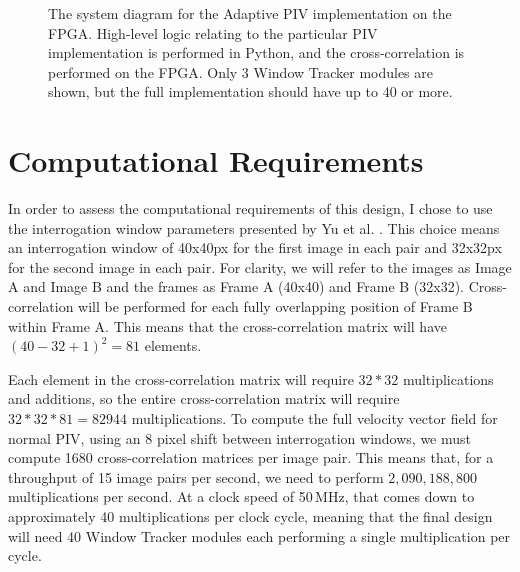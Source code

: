 \documentclass{article}
\begin{document}
\begin{figure}[htbp]
	\caption{The system diagram for the Adaptive PIV implementation on the FPGA. High-level logic relating to the particular PIV implementation is performed in Python, and the cross-correlation is performed on the FPGA. Only 3 Window Tracker modules are shown, but the full implementation should have up to 40 or more.}
	\label{fig:system}
\end{figure}

\section{Computational Requirements}
\label{sec:computation}
In order to assess the computational requirements of this design, I chose to use the interrogation window parameters presented by Yu et al. \citep{Yu:2006tb}. This choice means an interrogation window of 40x40px for the first image in each pair and 32x32px for the second image in each pair. For clarity, we will refer to the images as Image A and Image B and the frames as Frame A (40x40) and Frame B (32x32). Cross-correlation will be performed for each fully overlapping position of Frame B within Frame A. This means that the cross-correlation matrix will have $(40 - 32 + 1) ^2 = 81$ elements. 

Each element in the cross-correlation matrix will require $32 * 32$ multiplications and additions, so the entire cross-correlation matrix will require $32 * 32 * 81 = 82944$ multiplications. To compute the full velocity vector field for normal PIV, using an 8 pixel shift between interrogation windows, we must compute 1680 cross-correlation matrices per image pair. This means that, for a throughput of 15 image pairs per second, we need to perform $2,090,188,800$ multiplications per second. At a clock speed of 50\,MHz, that comes down to approximately 40 multiplications per clock cycle, meaning that the final design will need 40 Window Tracker modules each performing a single multiplication per cycle. 
\end{document}
